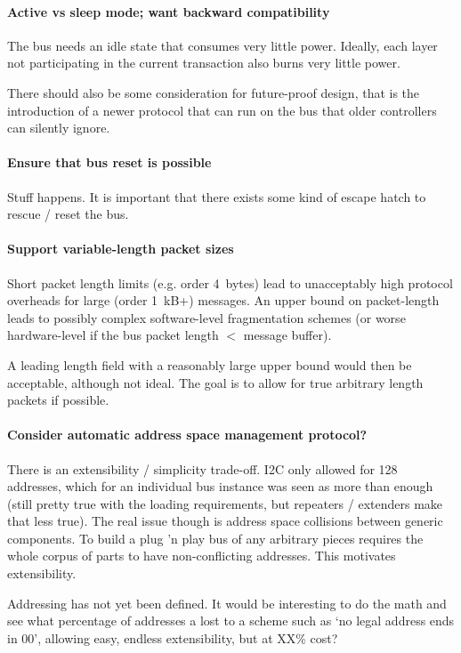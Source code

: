 \paragraph{Active vs sleep mode; want backward compatibility}
The bus needs an idle state that consumes very little power. Ideally, each
layer not participating in the current transaction also burns very little
power.

There should also be some consideration for future-proof design, that is the
introduction of a newer protocol that can run on the bus that older
controllers can silently ignore.

\paragraph{Ensure that bus reset is possible}
Stuff happens. It is important that there exists some kind of escape hatch to
rescue / reset the bus.

\paragraph{Support variable-length packet sizes}
Short packet length limits (e.g. order 4~bytes) lead to unacceptably high
protocol overheads for large (order 1~kB+) messages. An upper bound on
packet-length leads to possibly complex software-level fragmentation schemes
(or worse hardware-level if the bus packet length $<$ message buffer).

A leading length field with a reasonably large upper bound would then be
acceptable, although not ideal. The goal is to allow for true arbitrary length
packets if possible.

\paragraph{Consider automatic address space management protocol?}
There is an extensibility / simplicity trade-off. I2C only allowed for 128
addresses, which for an individual bus instance was seen as more than enough
(still pretty true with the loading requirements, but repeaters / extenders
make that less true). The real issue though is address space collisions
between generic components. To build a plug 'n play bus of any arbitrary
pieces requires the whole corpus of parts to have non-conflicting addresses.
This motivates extensibility.

Addressing has not yet been defined. It would be interesting to do the math
and see what percentage of addresses a lost to a scheme such as `no legal
address ends in 00', allowing easy, endless extensibility, but at XX\% cost?


